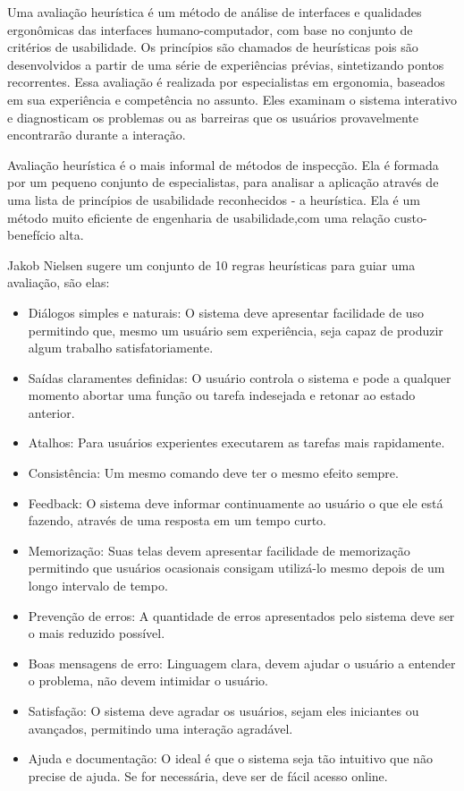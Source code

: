 Uma avaliação heurística é um método de análise de interfaces e qualidades ergonômicas das interfaces humano-computador, com base no conjunto de critérios de usabilidade.  Os princípios são chamados de heurísticas pois são desenvolvidos a partir de uma série de experiências prévias, sintetizando pontos recorrentes. Essa avaliação é realizada por especialistas em ergonomia, baseados em sua experiência e competência no assunto. Eles examinam o sistema interativo e diagnosticam os problemas ou as barreiras que os usuários provavelmente encontrarão durante a interação.
\cite{cybil_apostila}

Avaliação heurística é o mais informal de métodos de inspecção. Ela é formada por um pequeno conjunto de especialistas, para analisar a aplicação através de uma lista de princípios de usabilidade reconhecidos - a heurística. Ela é um método muito eficiente de engenharia de usabilidade,com uma relação custo-benefício alta.

Jakob Nielsen sugere um conjunto de 10 regras heurísticas para guiar uma avaliação, são elas:

\begin{itemize}
  \item Diálogos simples e naturais: O sistema deve apresentar facilidade de uso permitindo que, mesmo um usuário sem experiência, seja capaz de produzir algum trabalho satisfatoriamente.
  \item Saídas claramentes definidas: O usuário controla o sistema e pode a qualquer momento abortar uma função ou tarefa indesejada e retonar ao estado anterior.
  \item Atalhos: Para usuários experientes executarem as tarefas mais rapidamente.
  \item Consistência: Um mesmo comando deve ter o mesmo efeito sempre. 
  \item Feedback: O sistema deve informar continuamente ao usuário o que ele está fazendo, através de uma resposta em um tempo curto.
  \item Memorização: Suas telas devem apresentar facilidade de memorização permitindo que usuários ocasionais consigam utilizá-lo mesmo depois de um longo intervalo de tempo.
  \item Prevenção de erros: A quantidade de erros apresentados pelo sistema deve ser o mais reduzido possível.
  \item Boas mensagens de erro: Linguagem clara, devem ajudar o usuário a entender o problema, não devem intimidar o usuário.
  \item Satisfação: O sistema deve agradar os usuários, sejam eles iniciantes ou avançados, permitindo uma interação agradável.
  \item Ajuda e documentação: O ideal é que o sistema seja tão intuitivo que não precise de ajuda. Se for necessária, deve ser de fácil acesso online.
\end{itemize}


